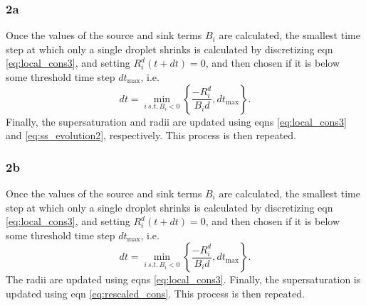 \documentclass[12pt]{article}
\begin{document}
\subsubsection{2a}
Once the values of the source and sink terms $B_i$ are calculated, the smallest time step at which only a single droplet shrinks is calculated by discretizing eqn \ref{eq:local_cons3}, and setting $R_i^d(t+dt)=0$, and then chosen if it is below some threshold time step $dt_{\text{max}}$, i.e.
\begin{equation}\label{eq:min_step}
dt=\min_{i\:s.t.\: B_i<0}\left\{\frac{-R_i^d}{B_i d},dt_{\text{max}}\right\}.
\end{equation}
Finally, the supersaturation and radii are updated using eqns \ref{eq:local_cons3} and \ref{eq:ss_evolution2}, respectively. This process is then repeated.

\subsubsection{2b}
Once the values of the source and sink terms $B_i$ are calculated, the smallest time step at which only a single droplet shrinks is calculated by discretizing eqn \ref{eq:local_cons3}, and setting $R_i^d(t+dt)=0$, and then chosen if it is below some threshold time step $dt_{\text{max}}$, i.e.
\begin{equation}\label{eq:min_step}
dt=\min_{i\:s.t.\: B_i<0}\left\{\frac{-R_i^d}{B_i d},dt_{\text{max}}\right\}.
\end{equation}
The radii are updated using eqns \ref{eq:local_cons3}. Finally, the supersaturation is updated using eqn \ref{eq:rescaled_cons}. This process is then repeated.


\clearpage


\end{document}
